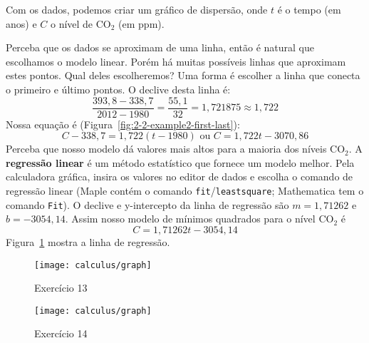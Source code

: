 \solution Com os dados, podemos criar um gráfico de dispersão, onde $t$ é o tempo (em anos) e $C$ o nível de CO$_2$ (em ppm).

Perceba que os dados se aproximam de uma linha, então é natural que escolhamos o modelo linear. Porém há muitas possíveis linhas que aproximam estes pontos. Qual deles escolheremos? Uma forma é escolher a linha que conecta o primeiro e último pontos. O declive desta linha é: $$\frac{393,8-338,7}{2012-1980}=\frac{55,1}{32}=1,721875\approx 1,722$$
Nossa equação é (Figura~\ref{fig:2-2-example2-first-last}): $$C-338,7=1,722(t-1980) \text{ ou } C = 1,722t-3070,86$$
Perceba que nosso modelo dá valores mais altos para a maioria dos níveis CO$_2$. A \textbf{regressão linear} é um método estatístico que fornece um modelo melhor. Pela calculadora gráfica, insira os valores no editor de dados e escolha o comando de regressão linear (Maple contém o comando \verb|fit|/\verb|leastsquare|; Mathematica tem o comando \verb|Fit|). O declive e y-intercepto da linha de regressão são $m=1,71262$ e $b=-3054,14$. Assim nosso modelo de mínimos quadrados para o nível CO$_2$ é $$C=1,71262t-3054,14$$
Figura~\ref{fig:2-2-example2-regression} mostra a linha de regressão.
\vspace{-0.5cm}\begin{figure}[!ht]
  \centering
  \begin{minipage}{0.49\columnwidth}
    \texttt{[image: calculus/graph]}
    \caption{Exercício 13}
    \label{fig:2-2-example2-first-last}
  \end{minipage}
  \begin{minipage}{0.49\columnwidth}
    \texttt{[image: calculus/graph]}
    \caption{Exercício 14}
    \label{fig:2-2-example2-regression}
  \end{minipage}\vspace{-1.5cm}
\end{figure}

\vspace{0.8cm}
\exampleEnd
